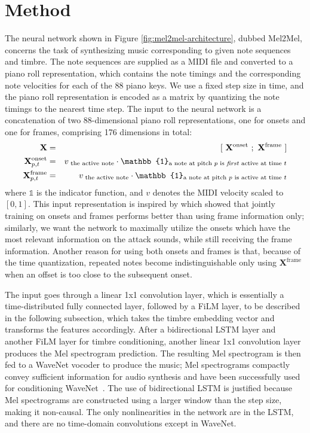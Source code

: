 \pagebreak %

\section{Method}\label{sec:method}

The neural network shown in Figure \ref{fig:mel2mel-architecture}, dubbed Mel2Mel, concerns the task of synthesizing music corresponding to given note sequences and timbre.
The note sequences are supplied as a MIDI file and converted to a piano roll representation, which contains the note timings and the corresponding note velocities for each of the 88 piano keys.
We use a fixed step size in time, and the piano roll representation is encoded as a matrix by quantizing the note timings to the nearest time step.
The input to the neural network is a concatenation of two 88-dimensional piano roll representations, one for onsets and one for frames, comprising 176 dimensions in total:
\begin{eqnarray*}
	\mathbf{X} & =&  [~ \mathbf{X}^{\textrm{onset}} ~;~ \mathbf{X}^{\textrm{frame}} ~] \\
	\mathbf{X}^{\textrm{onset}}_{p,t} &= & v_{\textrm{~the active note}} \cdot \mathbb{1}_{\textrm{a note at pitch $p$ is \textit{first} active at time $t$}} \\
	\mathbf{X}^{\textrm{frame}}_{p,t} &= & v_{\textrm{~the active note}} \cdot \mathbb{1}_{\textrm{a note at pitch $p$ is active at time $t$}}
\end{eqnarray*}
\noindent where $\mathbb{1}$ is the indicator function, and $v$ denotes the MIDI velocity scaled to $[0, 1]$.
This input representation is inspired by \cite{hawthorne2017onsets} which showed that jointly training on onsets and frames performs better than using frame information only;
similarly, we want the network to maximally utilize the onsets which have the most relevant information on the attack sounds, while still receiving the frame information.
Another reason for using both onsets and frames is that, because of the time quantization, repeated notes become indistinguishable only using $\mathbf{X}^\textrm{frame}$ when an offset is too close to the subsequent onset.

The input goes through a linear 1x1 convolution layer, which is essentially a time-distributed fully connected layer, followed by a FiLM layer, to be described in the following subsection, which takes the timbre embedding vector and transforms the features accordingly.
After a bidirectional LSTM layer and another FiLM layer for timbre conditioning, another linear 1x1 convolution layer produces the Mel spectrogram prediction.
The resulting Mel spectrogram is then fed to a WaveNet vocoder to produce the music; Mel spectrograms compactly convey sufficient information for audio synthesis and have been successfully used for conditioning WaveNet~\cite{shen2018tacotron,ping2018deepvoice}.
The use of bidirectional LSTM is justified because Mel spectrograms are constructed using a larger window than the step size, making it non-causal.
The only nonlinearities in the network are in the LSTM, and there are no time-domain convolutions except in WaveNet.



